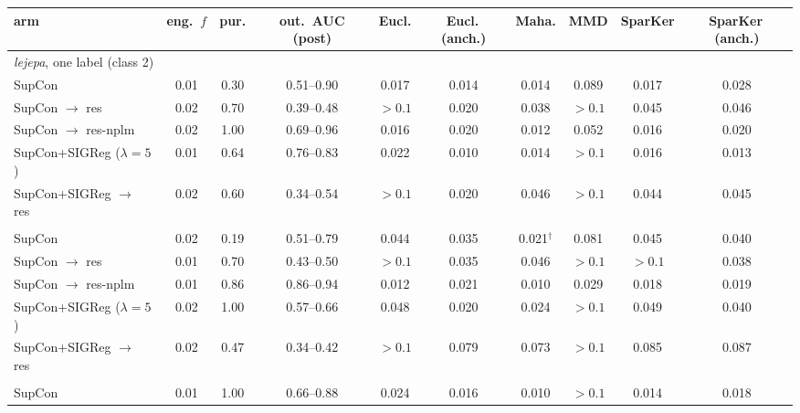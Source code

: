 \begin{table}[t]
\centering
\footnotesize
\begin{tabular}{lccccccccc}
\toprule
arm & eng.\ $f$ & pur. & out.\ AUC (post) & Eucl. & Eucl.\,(anch.) & Maha. & MMD & SparKer & SparKer\,(anch.) \\
\midrule
\multicolumn{10}{l}{\emph{lejepa}, one label (class 2)} \\
SupCon & 0.01 & 0.30 & 0.51--0.90 & 0.017 & 0.014 & 0.014 & 0.089 & 0.017 & 0.028 \\
\quad SupCon $\to$ res & 0.02 & 0.70 & 0.39--0.48 & $>0.1$ & 0.020 & 0.038 & $>0.1$ & 0.045 & 0.046 \\
\quad SupCon $\to$ res-nplm & 0.02 & 1.00 & 0.69--0.96 & 0.016 & 0.020 & 0.012 & 0.052 & 0.016 & 0.020 \\
SupCon+SIGReg ($\lambda{=}5$) & 0.01 & 0.64 & 0.76--0.83 & 0.022 & 0.010 & 0.014 & $>0.1$ & 0.016 & 0.013 \\
\quad SupCon+SIGReg $\to$ res & 0.02 & 0.60 & 0.34--0.54 & $>0.1$ & 0.020 & 0.046 & $>0.1$ & 0.044 & 0.045 \\
\addlinespace
\multicolumn{10}{l}{\emph{lejepa}, all seen labels} \\
SupCon & 0.02 & 0.19 & 0.51--0.79 & 0.044 & 0.035 & 0.021$^\dagger$ & 0.081 & 0.045 & 0.040 \\
\quad SupCon $\to$ res & 0.01 & 0.70 & 0.43--0.50 & $>0.1$ & 0.035 & 0.046 & $>0.1$ & $>0.1$ & 0.038 \\
\quad SupCon $\to$ res-nplm & 0.01 & 0.86 & 0.86--0.94 & 0.012 & 0.021 & 0.010 & 0.029 & 0.018 & 0.019 \\
SupCon+SIGReg ($\lambda{=}5$) & 0.02 & 1.00 & 0.57--0.66 & 0.048 & 0.020 & 0.024 & $>0.1$ & 0.049 & 0.040 \\
\quad SupCon+SIGReg $\to$ res & 0.02 & 0.47 & 0.34--0.42 & $>0.1$ & 0.079 & 0.073 & $>0.1$ & 0.085 & 0.087 \\
\addlinespace
\multicolumn{10}{l}{\emph{visreg}, one label (class 2)} \\
SupCon & 0.01 & 1.00 & 0.66--0.88 & 0.024 & 0.016 & 0.010 & $>0.1$ & 0.014 & 0.018 \\

\end{tabular}
\end{table}

